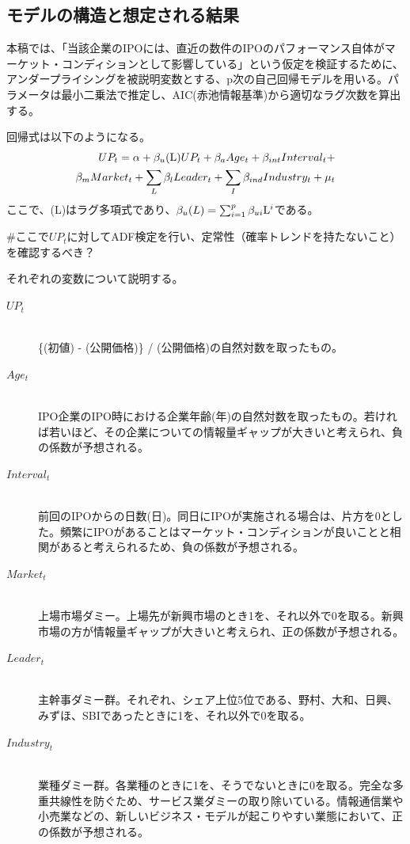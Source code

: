 \documentclass{jsarticle}
\begin{document}
\subsection{モデルの構造と想定される結果}
本稿では、「当該企業のIPOには、直近の数件のIPOのパフォーマンス自体がマーケット・コンディションとして影響している」という仮定を検証するために、アンダープライシングを被説明変数とする、p次の自己回帰モデルを用いる。パラメータは最小二乗法で推定し、AIC(赤池情報基準)から適切なラグ次数を算出する。\par
回帰式は以下のようになる。
\begin{equation}
\begin{split}
	UP_t = \alpha + \beta_u ({\rm L}) UP_t + \beta_a Age_t + \beta_{int} Interval_t + \\
	 \beta_m Market_t + \sum_{L} \beta_l Leader_t +  \sum_{I} \beta_{ind} Industry_t + \mu_t
\end{split}
\end{equation}
ここで、(L)はラグ多項式であり、$\beta_u(L) = \sum_{i=1}^p \beta_{ui} {\rm L}^i$である。\par
\#ここで$UP_t$に対してADF検定を行い、定常性（確率トレンドを持たないこと）を確認するべき？\par
\newpage
それぞれの変数について説明する。\par
\begin{description}
 \item[$UP_t$]\mbox{}\\ 
 \{(初値) - (公開価格)\} / (公開価格)の自然対数を取ったもの。
  \item[$Age_t$]\mbox{}\\
  IPO企業のIPO時における企業年齢(年)の自然対数を取ったもの。若ければ若いほど、その企業についての情報量ギャップが大きいと考えられ、負の係数が予想される。
  \item[$Interval_t$]\mbox{}\\
  前回のIPOからの日数(日)。同日にIPOが実施される場合は、片方を0とした。頻繁にIPOがあることはマーケット・コンディションが良いことと相関があると考えられるため、負の係数が予想される。
  \item[$Market_t$]\mbox{}\\
  上場市場ダミー。上場先が新興市場のとき1を、それ以外で0を取る。新興市場の方が情報量ギャップが大きいと考えられ、正の係数が予想される。
  \item[$Leader_t$]\mbox{}\\
  主幹事ダミー群。それぞれ、シェア上位5位である、野村、大和、日興、みずほ、SBIであったときに1を、それ以外で0を取る。
  \item[$Industry_t$]\mbox{}\\
  業種ダミー群。各業種のときに1を、そうでないときに0を取る。完全な多重共線性を防ぐため、サービス業ダミーの取り除いている。情報通信業や小売業などの、新しいビジネス・モデルが起こりやすい業態において、正の係数が予想される。
\end{description}\par
\end{document}
